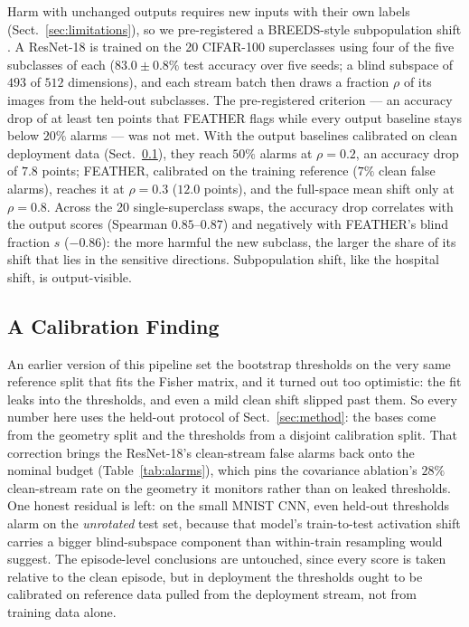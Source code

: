 \documentclass[acmsmall,screen]{acmart}
\theoremstyle{acmdefinition}
\begin{document}
Harm with unchanged outputs requires new inputs with their own labels
(Sect.~\ref{sec:limitations}), so we pre-registered a BREEDS-style subpopulation
shift \cite{santurkar2021breeds}. A ResNet-18 is trained on the 20 CIFAR-100
superclasses using four of the five subclasses of each ($83.0 \pm 0.8\%$ test
accuracy over five seeds; a blind subspace of $493$ of $512$ dimensions), and
each stream batch then draws a fraction $\rho$ of its images from the held-out
subclasses. The pre-registered criterion --- an accuracy drop of at least ten
points that FEATHER flags while every output baseline stays below $20\%$ alarms
--- was not met. With the output baselines calibrated on clean deployment data
(Sect.~\ref{sec:calibration}), they reach $50\%$ alarms at $\rho = 0.2$, an
accuracy drop of $7.8$ points; FEATHER, calibrated on the training reference
($7\%$ clean false alarms), reaches it at $\rho = 0.3$ ($12.0$ points), and the
full-space mean shift only at $\rho = 0.8$. Across the 20 single-superclass
swaps, the accuracy drop correlates with the output scores (Spearman
$0.85$--$0.87$) and negatively with FEATHER's blind fraction $s$ ($-0.86$): the
more harmful the new subclass, the larger the share of its shift that lies in
the sensitive directions. Subpopulation shift, like the hospital shift, is
output-visible.

\subsection{A Calibration Finding}
\label{sec:calibration}

An earlier version of this pipeline set the bootstrap thresholds on the very
same reference split that fits the Fisher matrix, and it turned out too
optimistic: the fit leaks into the thresholds, and even a mild clean shift
slipped past them. So every number here uses the held-out protocol of
Sect.~\ref{sec:method}: the bases come from the geometry split and the
thresholds from a disjoint calibration split. That correction brings the
ResNet-18's clean-stream false alarms back onto the nominal budget
(Table~\ref{tab:alarms}), which pins the covariance ablation's $28\%$
clean-stream rate on the geometry it monitors rather than on leaked
thresholds. One honest residual is left: on the small MNIST CNN, even
held-out thresholds alarm on the \emph{unrotated} test set, because that
model's train-to-test activation shift carries a bigger blind-subspace
component than within-train resampling would suggest. The episode-level
conclusions are untouched, since every score is taken relative to the clean
episode, but in deployment the thresholds ought to be calibrated on reference
data pulled from the deployment stream, not from training data alone.
\end{document}
